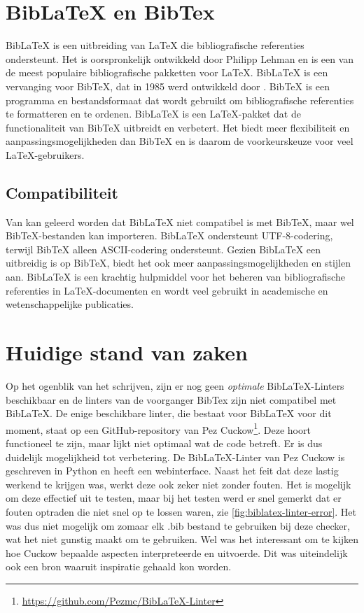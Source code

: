 \section{BibLaTeX en BibTex} %
BibLaTeX is een uitbreiding van \LaTeX{} die bibliografische referenties ondersteunt. Het is oorspronkelijk ontwikkeld door Philipp Lehman \autocite{Kime2024} en is een van de meest populaire bibliografische pakketten voor \LaTeX{}. BibLaTeX is een vervanging voor BibTeX, dat in 1985 werd ontwikkeld door \textcite{Patashnik1988}. BibTeX is een programma en bestandsformaat dat wordt gebruikt om bibliografische referenties te formatteren en te ordenen. BibLaTeX is een \LaTeX-pakket dat de functionaliteit van BibTeX uitbreidt en verbetert. Het biedt meer flexibiliteit en aanpassingsmogelijkheden dan BibTeX en is daarom de voorkeurskeuze voor veel \LaTeX-gebruikers.

\subsection{Compatibiliteit}
Van \textcite{Oetiker2023} kan geleerd worden dat BibLaTeX niet compatibel is met BibTeX, maar wel BibTeX-bestanden kan importeren. BibLaTeX ondersteunt UTF-8-codering, terwijl BibTeX alleen ASCII-codering ondersteunt. Gezien BibLaTeX een uitbreidig is op BibTeX, biedt het ook meer aanpassingsmogelijkheden en stijlen aan. BibLaTeX is een krachtig hulpmiddel voor het beheren van bibliografische referenties in \LaTeX-documenten en wordt veel gebruikt in academische en wetenschappelijke publicaties. 
\section{Huidige stand van zaken}
Op het ogenblik van het schrijven, zijn er nog geen \emph{optimale} BibLaTeX-Linters beschikbaar en de linters van de voorganger BibTex zijn niet compatibel met BibLaTeX. De enige beschikbare linter, die bestaat voor BibLaTeX voor dit moment, staat op een GitHub-repository van Pez Cuckow\footnote{\url{https://github.com/Pezmc/BibLaTeX-Linter}}. Deze hoort functioneel te zijn, maar lijkt niet optimaal wat de code betreft. Er is dus duidelijk mogelijkheid tot verbetering. De BibLaTeX-Linter van Pez Cuckow is geschreven in Python en heeft een webinterface. Naast het feit dat deze lastig werkend te krijgen was, werkt deze ook zeker niet zonder fouten. Het is mogelijk om deze effectief uit te testen, maar bij het testen werd er snel gemerkt dat er fouten optraden die niet snel op te lossen waren, zie \ref{fig:biblatex-linter-error}. Het was dus niet mogelijk om zomaar elk .bib bestand te gebruiken bij deze checker, wat het niet gunstig maakt om te gebruiken. Wel was het interessant om te kijken hoe Cuckow bepaalde aspecten interpreteerde en uitvoerde. Dit was uiteindelijk ook een bron waaruit inspiratie gehaald kon worden.

